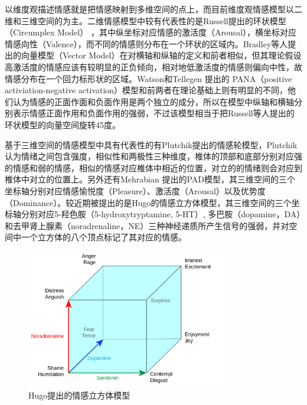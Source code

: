 以维度观描述情感就是把情感映射到多维空间的点上，而目前维度观情感模型以二维和三维空间的为主。二维情感模型中较有代表性的是Russell提出的环状模型（Circumplex Model）\cite{Russell1980Cir} ，其中纵坐标对应情感的激活度（Arousal），横坐标对应情感向性（Valence），而不同的情感则分布在一个环状的区域内。Bradley等人\cite{Bradley1992Rem}提出的向量模型（Vector Model）在对横轴和纵轴的定义和前者相似，但其理论假设高激活度的情感应该有较明显的正负倾向，相对地低激活度的情感则偏向中性，故情感分布在一个回力标形状的区域。Watson和Tellegen \cite{Watson1985Tow} 提出的 PANA（positive activiation-negative activation）模型和前两者在理论基础上则有明显的不同，他们认为情感的正面作面和负面作用是两个独立的成分，所以在模型中纵轴和横轴分别表示情感正面作用和负面作用的强弱，不过该模型相当于把Russell等人提出的环状模型的向量空间旋转45度\cite{Rubin2009A}。

基于三维空间的情感模型中具有代表性的有Plutchik\cite{Plutchik1980Emo}提出的情感轮模型，Plutchik认为情绪之间包含强度，相似性和两极性三种维度，椎体的顶部和底部分别对应强的情感和弱的情感，相似的情感对应椎体中相近的位置，对立的的情绪则会对应到椎体中对立的位置上。另外还有Mehrabian \cite{Mehrabian1996Pleasure}提出的PAD模型，其三维空间的三个坐标轴分别对应情感愉悦度（Pleasure）、激活度（Arousal）以及优势度（Dominance）。较近期被提出的是Hugo\cite{Hugo2012A}的情感立方体模型，其三维空间的三个坐标轴分别对应5-羟色胺（5-hydroxytryptamine, 5-HT）, 多巴胺（dopamine，DA）和去甲肾上腺素（noradrenaline，NE）三种神经递质所产生信号的强弱，并对空间中一个立方体的八个顶点标记了其对应的情感。

\begin{figure}[H] %
  \centering
  \includegraphics[width=0.8\textwidth]{img/hugo_cube_of_emotion.png}
  \caption{Hugo\cite{Hugo2012A}提出的情感立方体模型}
  \label{fig:hugo_cube_of_emotion}
\end{figure}

